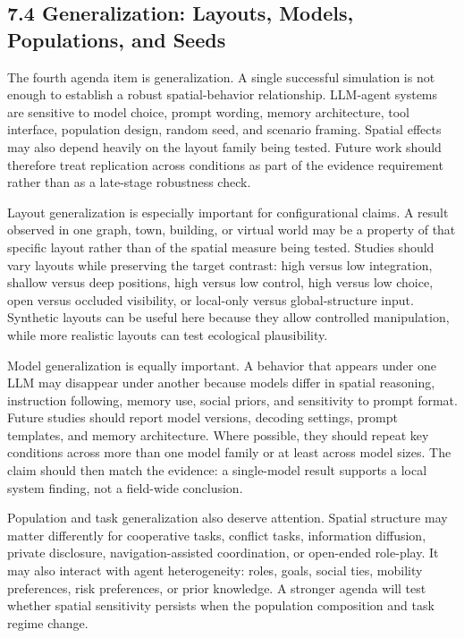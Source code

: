 \documentclass[
  twocolumn]{article}
\begin{document}
\subsection{7.4 Generalization: Layouts, Models, Populations, and
Seeds}\label{generalization-layouts-models-populations-and-seeds}

The fourth agenda item is generalization. A single successful simulation
is not enough to establish a robust spatial-behavior relationship.
LLM-agent systems are sensitive to model choice, prompt wording, memory
architecture, tool interface, population design, random seed, and
scenario framing. Spatial effects may also depend heavily on the layout
family being tested. Future work should therefore treat replication
across conditions as part of the evidence requirement rather than as a
late-stage robustness check.

Layout generalization is especially important for configurational
claims. A result observed in one graph, town, building, or virtual world
may be a property of that specific layout rather than of the spatial
measure being tested. Studies should vary layouts while preserving the
target contrast: high versus low integration, shallow versus deep
positions, high versus low control, high versus low choice, open versus
occluded visibility, or local-only versus global-structure input.
Synthetic layouts can be useful here because they allow controlled
manipulation, while more realistic layouts can test ecological
plausibility.

Model generalization is equally important. A behavior that appears under
one LLM may disappear under another because models differ in spatial
reasoning, instruction following, memory use, social priors, and
sensitivity to prompt format. Future studies should report model
versions, decoding settings, prompt templates, and memory architecture.
Where possible, they should repeat key conditions across more than one
model family or at least across model sizes. The claim should then match
the evidence: a single-model result supports a local system finding, not
a field-wide conclusion.

Population and task generalization also deserve attention. Spatial
structure may matter differently for cooperative tasks, conflict tasks,
information diffusion, private disclosure, navigation-assisted
coordination, or open-ended role-play. It may also interact with agent
heterogeneity: roles, goals, social ties, mobility preferences, risk
preferences, or prior knowledge. A stronger agenda will test whether
spatial sensitivity persists when the population composition and task
regime change.
\end{document}
